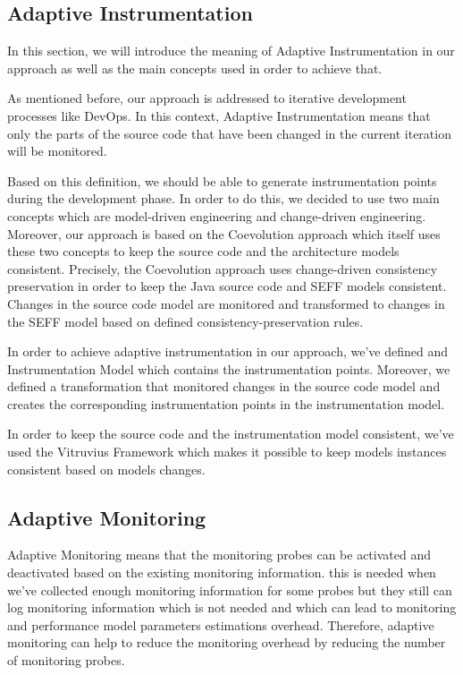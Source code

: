 \subsection{Adaptive Instrumentation}
\label{sec:Adaptive Instrumentation}
In this section, we will introduce the meaning of Adaptive Instrumentation in our approach as well as the main concepts used in order to achieve that.

As mentioned before, our approach is addressed to iterative development processes like DevOps. In this context, Adaptive Instrumentation means that only the parts of the source code that have been changed in the current iteration will be monitored. 

Based on this definition, we should be able to generate instrumentation points during the development phase. In order to do this, we decided to use two main concepts which are model-driven engineering and change-driven engineering. Moreover, our approach is based on the Coevolution approach which itself uses these two concepts to keep the source code and the architecture models consistent. Precisely, the Coevolution approach uses change-driven consistency preservation in order to keep the Java source code and SEFF models consistent. Changes in the source code model are monitored and transformed to changes in the SEFF model based on defined consistency-preservation rules. 

In order to achieve adaptive instrumentation in our approach, we’ve defined and Instrumentation Model which contains the instrumentation points. Moreover, we defined a transformation that monitored changes in the source code model and creates the corresponding instrumentation points in the instrumentation model. 

In order to keep the source code and the instrumentation model consistent, we've used the Vitruvius Framework which makes it possible to keep models instances consistent based on models changes. 

\subsection{Adaptive Monitoring}
\label{sec:Adaptive Monitoring}
Adaptive Monitoring means that the monitoring probes can be activated and deactivated based on the existing monitoring information. this is needed when we’ve collected enough monitoring information for some probes but they still can log monitoring information which is not needed and which can lead to monitoring and performance model parameters estimations overhead.  Therefore, adaptive monitoring can help to reduce the monitoring overhead by reducing the number of monitoring probes. 

